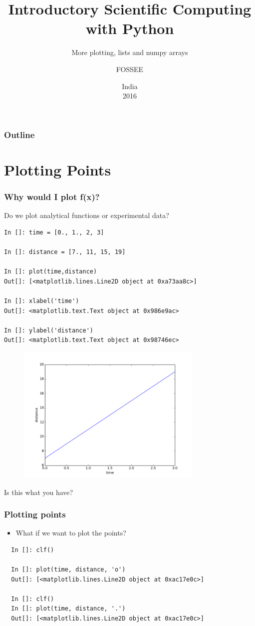 \documentclass[14pt,compress]{beamer}
\title[Interactive Plotting]{Introductory Scientific Computing with
Python}
\subtitle{More plotting, lists and numpy arrays}
\author[Prabhu] {FOSSEE}
\institute[FOSSEE -- IITB] {Department of Aerospace Engineering\\IIT Bombay}
\date[] {India\\
2016
}
\newcounter{time}
\begin{document}
\begin{frame}
  \titlepage
\end{frame}

\begin{frame}
  \frametitle{Outline}
  \tableofcontents
\end{frame}

\section{Plotting Points}
\begin{frame}[fragile]
\frametitle{Why would I plot f(x)?}
Do we plot analytical functions or experimental data?
\begin{small}
\begin{lstlisting}
In []: time = [0., 1., 2, 3]

In []: distance = [7., 11, 15, 19]

In []: plot(time,distance)
Out[]: [<matplotlib.lines.Line2D object at 0xa73aa8c>]

In []: xlabel('time')
Out[]: <matplotlib.text.Text object at 0x986e9ac>

In []: ylabel('distance')
Out[]: <matplotlib.text.Text object at 0x98746ec>
\end{lstlisting}
\end{small}
\end{frame}

\begin{frame}[fragile]
\begin{figure}
\includegraphics[width=3.5in]{data/straightline.png}
\end{figure}
\alert{Is this what you have?}
\end{frame}

\begin{frame}[fragile]
\frametitle{Plotting points}
\begin{itemize}
\item What if we want to plot the points?
\end{itemize}
\begin{lstlisting}
  In []: clf()

  In []: plot(time, distance, 'o')
  Out[]: [<matplotlib.lines.Line2D object at 0xac17e0c>]

  In []: clf()
  In []: plot(time, distance, '.')
  Out[]: [<matplotlib.lines.Line2D object at 0xac17e0c>]
\end{lstlisting}
\end{frame}
\end{document}
